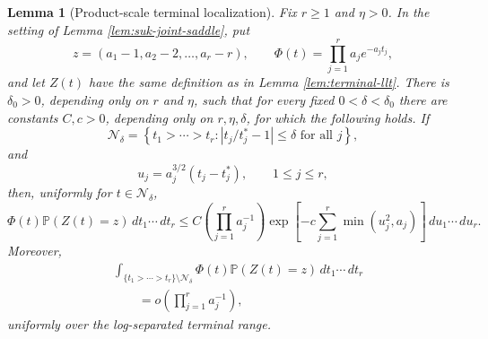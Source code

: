 \documentclass[11pt]{article}
\newtheorem{lemma}[theorem]{Lemma}
\theoremstyle{remark}
\newcommand{\Pp}{\mathbb P}
\newcommand{\dd}{\,d}
\begin{document}
\begin{lemma}[Product-scale terminal localization]\label{lem:terminal-product-localization}
Fix \(r\ge1\) and \(\eta>0\).  In the setting of Lemma \ref{lem:suk-joint-saddle}, put
\[
        z=(a_1-1,a_2-2,\ldots,a_r-r),
        \qquad
        \Phi(t)=\prod_{j=1}^r a_j e^{-a_jt_j},
\]
and let \(Z(t)\) have the same definition as in Lemma \ref{lem:terminal-llt}.  There is \(\delta_0>0\), depending only on \(r\) and \(\eta\), such that for every fixed \(0<\delta<\delta_0\) there are constants \(C,c>0\), depending only on \(r,\eta,\delta\), for which the following holds.  If
\[
        \mathcal N_\delta
        =\left\{t_1>\cdots>t_r:
        |t_j/t_j^*-1|\le\delta\text{ for all }j\right\},
\]
and
\[
        u_j=a_j^{3/2}(t_j-t_j^*),
        \qquad 1\le j\le r,
\]
then, uniformly for \(t\in\mathcal N_\delta\),
\[
        \Phi(t)\Pp(Z(t)=z)\dd t_1\cdots\dd t_r
        \le C\left(\prod_{j=1}^r a_j^{-1}\right)
        \exp\left[-c\sum_{j=1}^r\min(u_j^2,a_j)\right]
        \dd u_1\cdots\dd u_r .
\]
Moreover,
\[
\begin{aligned}
&\int_{\{t_1>\cdots>t_r\}\setminus\mathcal N_\delta}
        \Phi(t)\Pp(Z(t)=z)\dd t_1\cdots\dd t_r  \\
&\qquad =o\left(\prod_{j=1}^r a_j^{-1}\right),
\end{aligned}
\]
uniformly over the log-separated terminal range.
\end{lemma}
\end{document}
